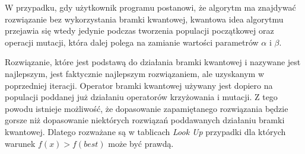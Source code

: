 W przypadku, gdy użytkownik programu postanowi, że algorytm ma znajdywać rozwiązanie bez wykorzystania bramki kwantowej, kwantowa idea algorytmu przejawia się wtedy jedynie podczas tworzenia populacji początkowej oraz operacji mutacji, która dalej polega na zamianie wartości parametrów $\alpha$ i $\beta$.

Rozwiązanie, które jest podstawą do działania bramki kwantowej i nazywane jest najlepszym, jest faktycznie najlepszym rozwiązaniem, ale uzyskanym w poprzedniej iteracji. Operator bramki kwantowej używany jest dopiero na populacji poddanej już działaniu operatorów krzyżowania i mutacji. Z tego powodu istnieje możliwość, że dopasowanie zapamiętanego rozwiązania będzie gorsze niż dopasowanie niektórych rozwiązań poddawanych działaniu bramki kwantowej. Dlatego rozważane są w tablicach \textit{Look Up} przypadki dla których warunek $f(x)>f(best)$ może być prawdą.